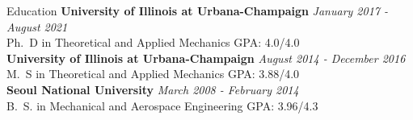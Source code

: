 \documentclass{resume} %
\begin{document}

\begin{rSection}{Education}
{\bf University of Illinois at Urbana-Champaign} \hfill {\em January 2017 - August 2021} 
\\ Ph.\ D in Theoretical and Applied Mechanics \hfill {GPA: 4.0/4.0}\\
{\bf University of Illinois at Urbana-Champaign} \hfill {\em August 2014 - December 2016} 
\\ M.\ S in Theoretical and Applied Mechanics \hfill {GPA: 3.88/4.0}\\
{\bf Seoul National University} \hfill {\em March 2008 - February 2014} 
\\ B.\ S. in Mechanical and Aerospace Engineering \hfill {GPA: 3.96/4.3}
\end{rSection}



\end{document}
